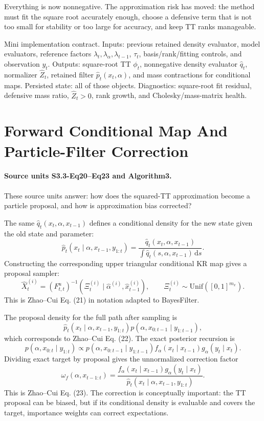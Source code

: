 \documentclass[11pt]{article}
\newcommand{\dd}{\,\mathrm d}
\begin{document}
Everything is now nonnegative.  The approximation risk has moved: the method
must fit the square root accurately enough, choose a defensive term that is not
too small for stability or too large for accuracy, and keep TT ranks manageable.

Mini implementation contract.  Inputs: previous retained density evaluator,
model evaluators, reference factors \(\lambda_t,\lambda_\alpha,\lambda_{t-1}\),
\(\tau_t\), basis/rank/fitting controls, and observation \(y_t\).  Outputs:
square-root TT \(\phi_t\), nonnegative density evaluator \(\widehat q_t\),
normalizer \(\widehat Z_t\), retained filter \(\widehat p_t(x_t,\alpha)\), and
mass contractions for conditional maps.  Persisted state: all of those objects.
Diagnostics: square-root fit residual, defensive mass ratio, \(\widehat Z_t>0\),
rank growth, and Cholesky/mass-matrix health.

\section{Forward Conditional Map And Particle-Filter Correction}

\paragraph{Source units S3.3-Eq20--Eq23 and Algorithm3.}
These source units answer: how does the squared-TT approximation become a
particle proposal, and how is approximation bias corrected?

The same \(\widehat q_t(x_t,\alpha,x_{t-1})\) defines a conditional density for
the new state given the old state and parameter:
\[
    \widehat p_t(x_t\mid \alpha,x_{t-1},y_{1:t})
    =
    \frac{\widehat q_t(x_t,\alpha,x_{t-1})}
    {\int \widehat q_t(s,\alpha,x_{t-1})\dd s}.
    \tag{F1}
\]
Constructing the corresponding upper triangular conditional KR map gives a
proposal sampler:
\[
    \widehat X_t^{(i)}
    =
    (F_{t,t}^{u})^{-1}
    \left(\Xi_t^{(i)}\mid \widehat\alpha^{(i)},\widehat x_{t-1}^{(i)}\right),
    \qquad
    \Xi_t^{(i)}\sim\mathrm{Unif}([0,1]^{m_x}).
    \tag{F2}
\]
This is Zhao--Cui Eq. (21) in notation adapted to BayesFilter.

The proposal density for the full path after sampling is
\[
    \widehat p_t(x_t\mid \alpha,x_{t-1},y_{1:t})
    p(\alpha,x_{0:t-1}\mid y_{1:t-1}),
    \tag{F3}
\]
which corresponds to Zhao--Cui Eq. (22).  The exact posterior recursion is
\[
    p(\alpha,x_{0:t}\mid y_{1:t})
    \propto
    p(\alpha,x_{0:t-1}\mid y_{1:t-1})
    f_\alpha(x_t\mid x_{t-1})
    g_\alpha(y_t\mid x_t).
\]
Dividing exact target by proposal gives the unnormalized correction factor
\[
    \omega_f(\alpha,x_{t-1:t})
    =
    \frac{
    f_\alpha(x_t\mid x_{t-1})g_\alpha(y_t\mid x_t)}
    {\widehat p_t(x_t\mid \alpha,x_{t-1},y_{1:t})}.
    \tag{F4}
\]
This is Zhao--Cui Eq. (23).  The correction is conceptually important: the TT
proposal can be biased, but if its conditional density is evaluable and covers
the target, importance weights can correct expectations.
\end{document}
